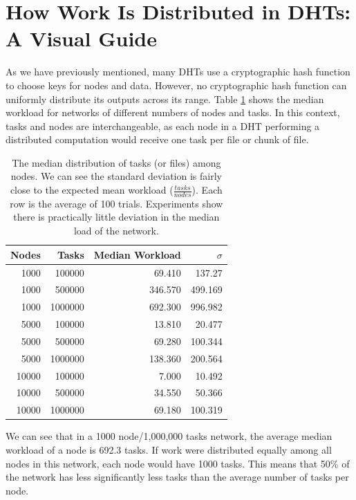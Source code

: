 \documentclass[11pt,letterpaper]{article}
\begin{document}
\section{How Work Is Distributed in DHTs: A Visual Guide}

As we have previously mentioned, many DHTs use a cryptographic hash function to choose keys for nodes and data.
However, no cryptographic hash function can uniformly distribute its outputs across its range. 
Table \ref{tab:medianLoads} shows the median workload for networks of different numbers of nodes and tasks.
In this context, tasks and nodes are interchangeable, as each node in a DHT performing a distributed computation would receive one task per file or chunk of file.


\begin{table}
	\centering
	\caption{The median distribution of tasks (or files) among nodes.  We can see the standard deviation is fairly close to the expected mean workload ($\frac{tasks}{nodes}$). Each row is the average of 100 trials.  Experiments show there is practically little deviation in the median load of the network.}
	\begin{tabular}{r r r r}
		Nodes & Tasks & Median Workload & $\sigma$ \\ \hline
		1000 & 100000 & 69.410   &  137.27  \\
		1000 & 500000 & 346.570  &  499.169 \\
		1000 & 1000000 & 692.300  &  996.982 \\
		
		5000 & 100000  & 13.810 & 20.477 \\ 
		5000 & 500000  & 69.280 & 100.344 \\ 
		5000 & 1000000 &138.360 & 200.564 \\ 
		
		10000 & 100000 & 7.000   &  10.492 \\
		10000 & 500000 & 34.550  &   50.366 \\
		10000 & 1000000& 69.180  &  100.319 \\
	\end{tabular}
	\label{tab:medianLoads}
\end{table}



We can see  that in a 1000 node/1,000,000 tasks network, the average median workload of a node is 692.3 tasks. 
If work were distributed equally among all nodes in this network, each node would have 1000 tasks.
This means that 50\% of the network has less significantly less tasks than the average number of tasks per node.
\end{document}
